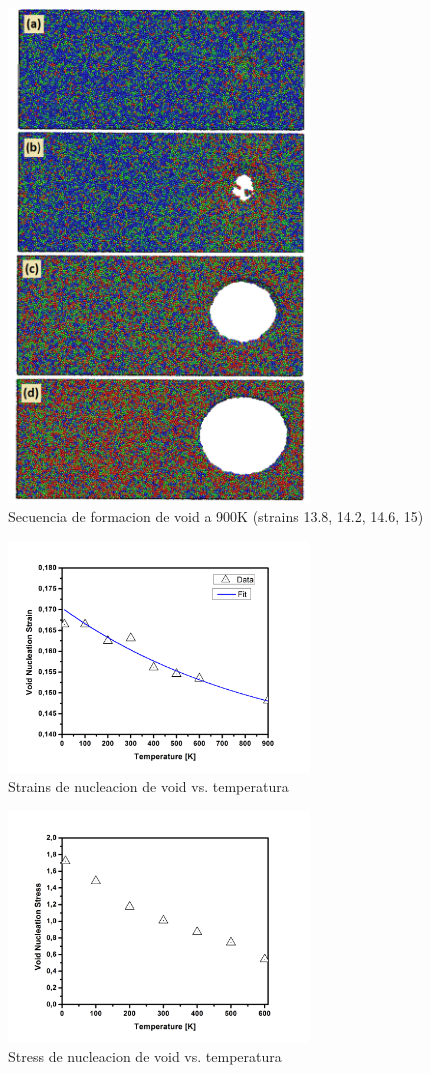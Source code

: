 \documentclass[10pt, oneside]{article} %
\begin{document}
\begin{figure}[H]
\centering
\includegraphics[width=8cm]{Figures/void_sequence.png}
\caption{Secuencia de formacion de void a 900K (strains 13.8, 14.2, 14.6, 15)}
\end{figure}

\begin{figure}[H]
\centering
\includegraphics[width=8cm]{Figures/VoidNucleationStrain_Vs_Temp_TENSION.png}
\caption{Strains de nucleacion de void vs. temperatura}
\end{figure}

\begin{figure}[H]
\centering
\includegraphics[width=8cm]{Figures/VoidNucleationStress_Vs_Temp_TENSION.png}
\caption{Stress de nucleacion de void vs. temperatura}
\end{figure}
\end{document}
